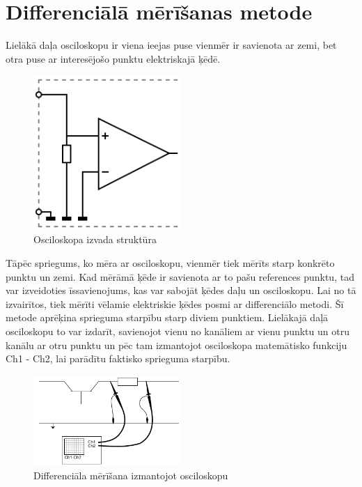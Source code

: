 \section{Differenciālā mērīšanas metode}

Lielākā daļa osciloskopu \cite{tiepie_diffmes} ir viena ieejas puse vienmēr ir savienota ar zemi, bet otra puse ar interesējošo punktu elektriskajā ķēdē.
\begin{figure}[H]
	\centering
    \includegraphics[width=0.5\textwidth]{pictures/osc_1_probe.png}\hspace{1cm}
    \caption{Osciloskopa izvada struktūra}
\end{figure}

Tāpēc spriegums, ko mēra ar osciloskopu, vienmēr tiek mērīts starp konkrēto punktu un zemi. Kad mērāmā ķēde ir savienota ar to pašu references punktu, tad var izveidoties īssavienojums, kas var sabojāt ķēdes daļu un osciloskopu. Lai no tā izvairītos, tiek mērīti vēlamie elektriskie ķēdes posmi ar differenciālo metodi. Šī metode aprēķina sprieguma starpību starp diviem punktiem. Lielākajā daļā osciloskopu to var izdarīt, savienojot vienu no kanāliem ar vienu punktu un otru kanālu ar otru punktu un pēc tam izmantojot osciloskopa matemātisko funkciju Ch1 - Ch2, lai parādītu faktisko sprieguma starpību.
\begin{figure}[H]
	\centering
    \includegraphics[width=0.5\textwidth]{pictures/osc_2_diff.png}\hspace{1cm}
    \caption{Differenciāla mērīšana izmantojot osciloskopu}
\end{figure}
